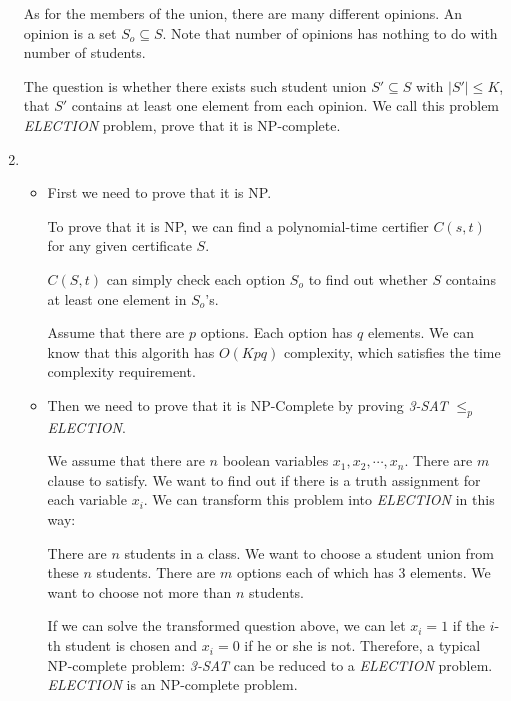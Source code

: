 \documentclass[12pt,a4paper]{article}
\makeatletter
\newtheorem*{solution}{Solution}
\theoremstyle{definition}
\renewenvironment{solution}[1][Solution] {\par\pushQED{\qed}\normalfont\topsep6\p@\@plus6\p@\relax\trivlist\item[\hskip\labelsep\bfseries#1\@addpunct{.}]\ignorespaces}{\popQED\endtrivlist\@endpefalse} \makeatother
\makeatother
\begin{document}
\begin{enumerate}
	As for the members of the union, there are many different opinions. An opinion is a set $S_o\subseteq S$. Note that number of opinions has nothing to do with number of students.
	
	The question is whether there exists such student union $S' \subseteq S$ with $|S'|\leq K$, that $S'$ contains at least one element from each opinion. We call this problem \emph{ELECTION} problem, prove that it is NP-complete.
	\begin{solution}
	\ \\
	    \begin{itemize}
	        \item 
	    First we need to prove that it is NP.
        
        To prove that it is NP, we can find a polynomial-time certifier $C(s,t)$ for any given certificate $S$.
        
        $C(S,t)$ can simply check each option $S_o$ to find out whether $S$ contains at least one element in $S_o$'s. 
        
        Assume that there are $p$ options. Each option has $q$ elements. We can know that this algorith has $O(Kpq)$ complexity, which satisfies the time complexity requirement.
        \item 
        Then we need to prove that it is NP-Complete by proving \emph{3-SAT} $\leq_p$ \emph{ELECTION}.
        
        We assume that there are $n$ boolean variables $x_1,x_2,\cdots,x_n$. There are $m$ clause to satisfy. We want to find out if there is a truth assignment for each variable $x_i$. We can transform this problem into \emph{ELECTION} in this way:
        
        There are $n$ students in a class. We want to choose a student union from these $n$ students. There are $m$ options each of which has $3$ elements. We want to choose not more than $n$ students.
        
        If we can solve the transformed question above, we can let $x_i=1$ if the $i$-th student is chosen and $x_i=0$ if he or she is not. Therefore, a typical NP-complete problem: \emph{3-SAT} can be reduced to a \emph{ELECTION} problem. \emph{ELECTION} is an NP-complete problem.
        \end{itemize}
        
    \end{solution}


\end{enumerate}
\end{document}
